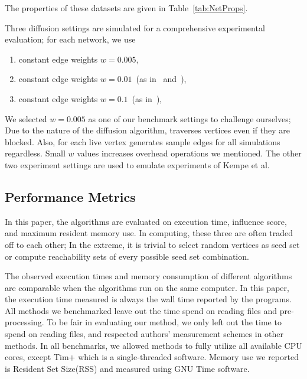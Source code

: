 \documentclass[10pt,journal,compsoc]{IEEEtran}
\newcommand\acro{{\sc{HyperFuseR\xspace}\xspace}\xspace}
\begin{document}
The properties of these datasets are given in Table~\ref{tab:NetProps}. 

Three diffusion settings are simulated for a comprehensive experimental evaluation; for each network, we use 
\begin{enumerate}
    \item constant edge weights $w = 0.005$,
    \item constant edge weights $w = 0.01$~(as in~\cite{kempe2003maximizing} and~\cite{MixGreedy}),
    \item constant edge weights $w = 0.1$~(as in~\cite{kempe2003maximizing}),
\end{enumerate}

We selected $w=0.005$ as one of our benchmark settings to challenge ourselves; Due to the nature of the diffusion algorithm, \acro traverses vertices even if they are blocked. Also, for each live vertex \acro generates sample edges for all simulations regardless. Small $w$ values increases overhead operations we mentioned. The other two experiment settings are used to emulate experiments of Kempe et al.~\cite{kempe2003maximizing}


\subsection{Performance Metrics}


In this paper, the algorithms are evaluated on execution time, influence score, and maximum resident memory use. In computing, these three are
often traded off to each other; In the extreme, it is trivial to select random vertices as seed set or compute reachability sets of every possible seed set combination. 

The observed execution times and memory consumption of different algorithms are comparable when the algorithms run on the same computer.
In this paper, the execution time measured is always the wall time reported by the programs. 
All methods we benchmarked leave out the time spend on reading files and pre-processing. To be fair in evaluating our method, we only left out the time to spend on reading files, and respected authors' measurement schemes in other methods. 
In all benchmarks, we allowed methods to fully utilize all available CPU cores, except {\sc Tim+} which is a single-threaded software. Memory use we reported is Resident Set Size(RSS) and measured using GNU Time software.
\end{document}
